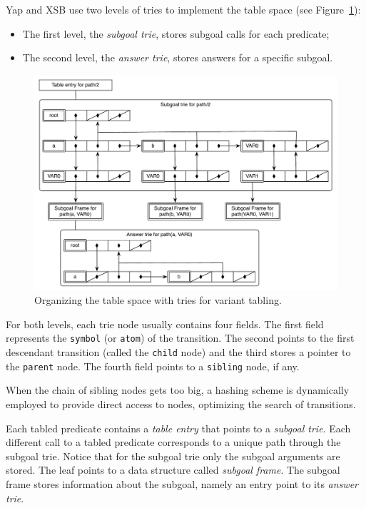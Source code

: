 Yap and XSB use two levels of tries to implement the table space (see Figure~\ref{fig:table_space_tries}):

\begin{itemize}
  \item The first level, the \emph{subgoal trie}, stores subgoal calls for each predicate;
  \item The second level, the \emph{answer trie}, stores answers for a specific subgoal.
\end{itemize}

\begin{figure}[ht]
   \centering
     \includegraphics[scale=0.6]{two_level_tries.pdf}
   \caption{Organizing the table space with tries for variant tabling.}
   \label{fig:table_space_tries}
 \end{figure}

For both levels, each trie node usually contains four fields. The first field represents the \texttt{symbol}
(or \texttt{atom}) of the transition. The second points to the first descendant transition (called the \texttt{child} node)
and the third stores a pointer to the \texttt{parent} node.
The fourth field points to a \texttt{sibling} node, if any.

When the chain of sibling nodes gets too big, a hashing scheme is dynamically employed to provide direct
access to nodes, optimizing the search of transitions.

Each tabled predicate contains a \textit{table entry} that points to a \textit{subgoal trie}.
Each different call to a tabled predicate corresponds to a unique path through the subgoal trie.
Notice that for the subgoal trie only the subgoal arguments are stored.
The leaf points to a data structure called \textit{subgoal frame}. The subgoal frame stores
information about the subgoal, namely an entry point to its \textit{answer trie}.

